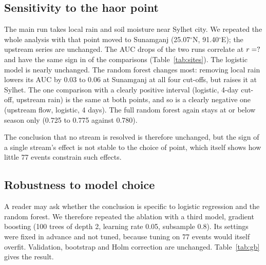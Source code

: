 \subsection{Sensitivity to the haor point}\label{sec:sites}
The main run takes local rain and soil moisture near Sylhet city. We repeated the whole analysis with that point moved to Sunamganj (25.07$^\circ$N, 91.40$^\circ$E); the upstream series are unchanged. The AUC drops of the two runs correlate at $r=?$ and have the same sign in \siteSameSign{} of the \nCells{} comparisons (Table~\ref{tab:sites}). The logistic model is nearly unchanged. The random forest changes most: removing local rain lowers its AUC by 0.03 to 0.06 at Sunamganj at all four cut-offs, but raises it at Sylhet. The one comparison with a clearly positive interval (logistic, 4-day cut-off, upstream rain) is the same at both points, and so is a clearly negative one (upstream flow, logistic, 4 days). The full random forest again stays at or below season only (0.725 to 0.775 against 0.780).

The conclusion that no stream is resolved is therefore unchanged, but the sign of a single stream's effect is not stable to the choice of point, which itself shows how little 77 events constrain such effects.

\begin{table}[t]
\centering\caption{Sensitivity to the location of the local-rain and soil-moisture point: stream-removal AUC drops over the 32 comparisons.}\label{tab:sites}
\small{}
\end{table}

\subsection{Robustness to model choice}\label{sec:gb}
A reader may ask whether the conclusion is specific to logistic regression and the random forest. We therefore repeated the ablation with a third model, gradient boosting (100 trees of depth 2, learning rate 0.05, subsample 0.8). Its settings were fixed in advance and not tuned, because tuning on 77 events would itself overfit. Validation, bootstrap and Holm correction are unchanged. Table~\ref{tab:gb} gives the result.


